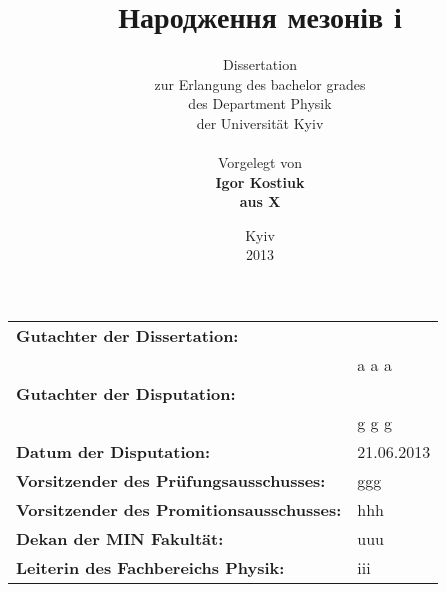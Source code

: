 \begin{titlepage}
\thispagestyle{empty}
\title{ Народження мезонів і   }

\author{Dissertation\\ zur Erlangung des bachelor grades\\
 des Department Physik\\ der Universit\"{a}t Kyiv\\
\\
Vorgelegt von\\ \bf{Igor Kostiuk}\\ aus X }                    
\date{\vspace{5.0cm} Kyiv \\ 2013}

\maketitle
\thispagestyle{empty} 
\end{titlepage}
\FloatBarrier
\newpage
\thispagestyle{empty}
\vspace*{0.65\textheight}
\begin{table}[!htbp]
\setlength{\tabcolsep}{4.0pt}
\begin{tabular}{ll}
{\bf Gutachter der Dissertation:} &  \\
                                  & a a a\\
{\bf Gutachter der Disputation:}  & \\
                                  & g g g\\
{\bf Datum der Disputation:} &   21.06.2013\\
{\bf Vorsitzender des Pr\"{u}fungsausschusses:} &  ggg\\
{\bf Vorsitzender des Promitionsausschusses:} & hhh \\
{\bf Dekan der MIN Fakult\"{a}t:} &  uuu\\
{\bf Leiterin des Fachbereichs Physik:} &  iii\\
\end{tabular}
\end{table}
\FloatBarrier
\newpage
